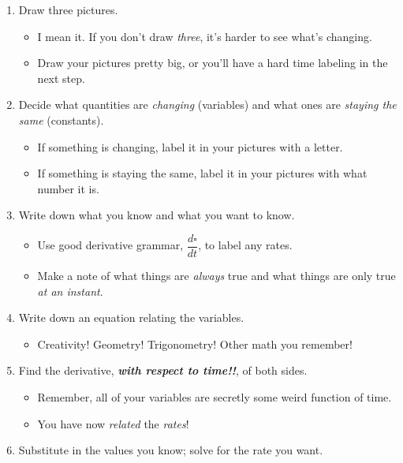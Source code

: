\begin{enumerate}[leftmargin=15pt]
    \item Draw three pictures.
    \begin{itemize}
        \item I mean it. If you don't draw \textit{three}, it's harder to see what's changing.
        \item Draw your pictures pretty big, or you'll have a hard time labeling in the next step.
    \end{itemize}
    \item Decide what quantities are \textit{changing} (variables) and what ones are \textit{staying the same} (constants).
    \begin{itemize}
        \item If something is changing, label it in your pictures with a letter.
        \item If something is staying the same, label it in your pictures with what number it is.
    \end{itemize}
    \item Write down what you know and what you want to know.
    \begin{itemize}
        \item Use good derivative grammar, \(\dfrac{d\square}{dt}\), to label any rates.
        \item Make a note of what things are \textit{always} true and what things are only true \textit{at an instant}.
    \end{itemize}
    \item Write down an equation relating the variables.
    \begin{itemize}
        \item Creativity! Geometry! Trigonometry! Other math you remember!
    \end{itemize}
    \item Find the derivative, \textit{\textbf{with respect to time!!}}, of both sides.
    \begin{itemize}
        \item Remember, all of your variables are secretly some weird function of time.
        \item You have now \textit{related} the \textit{rates}!
    \end{itemize}
    \item Substitute in the values you know; solve for the rate you want.

\end{enumerate}

